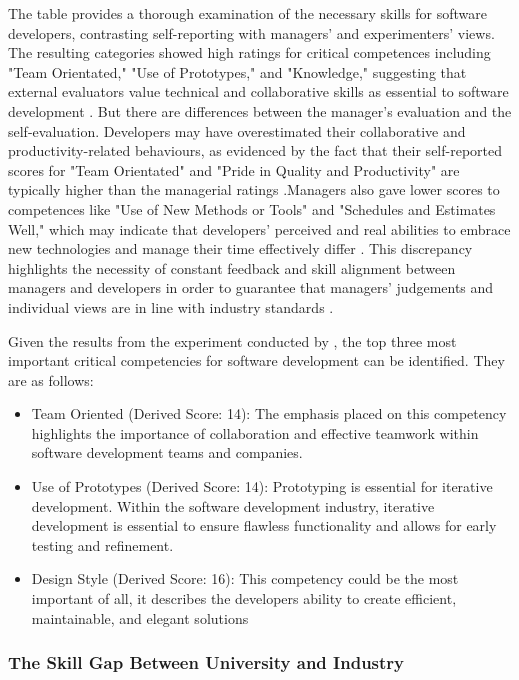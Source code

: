 \par{The table provides a thorough examination of the necessary skills for software developers, contrasting self-reporting with managers' and experimenters' views. The resulting categories showed high ratings for critical competences including "Team Orientated," "Use of Prototypes," and "Knowledge," suggesting that external evaluators value technical and collaborative skills as essential to software development \citep{mcconnell1996rapid}. But there are differences between the manager's evaluation and the self-evaluation. Developers may have overestimated their collaborative and productivity-related behaviours, as evidenced by the fact that their self-reported scores for "Team Orientated" and "Pride in Quality and Productivity" are typically higher than the managerial ratings .Managers also gave lower scores to competences like "Use of New Methods or Tools" and "Schedules and Estimates Well," which may indicate that developers' perceived and real abilities to embrace new technologies and manage their time effectively differ \citep{brooks1987essence}. This discrepancy highlights the necessity of constant feedback and skill alignment between managers and developers in order to guarantee that managers' judgements and individual views are in line with industry standards \citep{fagerholm2014role}.

Given the results from the experiment conducted by \cite{turley1994identifying}, the top three most important critical competencies for software development can be identified. They are as follows:
\begin{itemize}
    \item Team Oriented (Derived Score: 14): The emphasis placed on this competency highlights the importance of collaboration and effective teamwork within software development teams and companies.
    \item Use of Prototypes (Derived Score: 14): Prototyping is essential for iterative development. Within the software development industry, iterative development is essential to ensure flawless functionality and allows for early testing and refinement.
    \item Design Style (Derived Score: 16): This competency could be the most important of all, it describes the developers ability to create efficient, maintainable, and elegant solutions
\end{itemize}
}
    
\subsubsection{The Skill Gap Between University and Industry}
